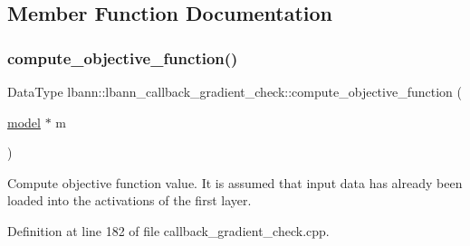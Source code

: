 \subsection{Member Function Documentation}
\mbox{\label{classlbann_1_1lbann__callback__gradient__check_a54ba40dd3b381d5c889d77edeffa37f9}} 
\subsubsection{\texorpdfstring{compute\+\_\+objective\+\_\+function()}{compute\_objective\_function()}}
{\footnotesize\ttfamily Data\+Type lbann\+::lbann\+\_\+callback\+\_\+gradient\+\_\+check\+::compute\+\_\+objective\+\_\+function (\begin{DoxyParamCaption}\item[{\hyperlink{classlbann_1_1model}{model} $\ast$}]{m }\end{DoxyParamCaption})}

Compute objective function value. It is assumed that input data has already been loaded into the activations of the first layer. 

Definition at line 182 of file callback\+\_\+gradient\+\_\+check.\+cpp.


